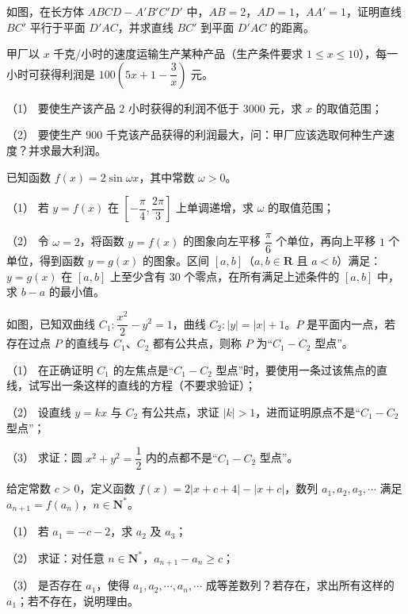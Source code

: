 \Needspace{0.4\textheight}
\begin{question}
如图，在长方体 $ABCD-A'B'C'D'$ 中，$AB=2$，$AD=1$，$AA'=1$，证明直线 $BC'$ 平行于平面 $D'AC$，并求直线 $BC'$ 到平面 $D'AC$ 的距离。
\nopagebreak[4]
\begin{center}\end{center}
\nopagebreak[4]
\end{question}
\begin{question}
甲厂以 $x$ 千克/小时的速度运输生产某种产品（生产条件要求 $1\leqslant x\leqslant10$），每一小时可获得利润是 $100\left(5x+1-\dfrac3x\right)$ 元。

（1） 要使生产该产品 $2$ 小时获得的利润不低于 $3000$ 元，求 $x$ 的取值范围；

（2） 要使生产 $900$ 千克该产品获得的利润最大，问：甲厂应该选取何种生产速度？并求最大利润。

\end{question}
\begin{question}
已知函数 $f(x)=2\sin\omega x$，其中常数 $\omega>0$。

（1） 若 $y=f(x)$ 在 $\left[-\dfrac{\pi}{4},\dfrac{2\pi}{3}\right]$ 上单调递增，求 $\omega$ 的取值范围；

（2） 令 $\omega=2$，将函数 $y=f(x)$ 的图象向左平移 $\dfrac{\pi}{6}$ 个单位，再向上平移 $1$ 个单位，得到函数 $y=g(x)$ 的图象。区间 $[a,b]$（$a,b\in\mathbf R$ 且 $a<b$）满足：$y=g(x)$ 在 $[a,b]$ 上至少含有 $30$ 个零点，在所有满足上述条件的 $[a,b]$ 中，求 $b-a$ 的最小值。

\Needspace{0.4\textheight}
\end{question}
\begin{question}
如图，已知双曲线 $C_1:\dfrac{x^2}{2}-y^2=1$，曲线 $C_2:|y|=|x|+1$。$P$ 是平面内一点，若存在过点 $P$ 的直线与 $C_1$、$C_2$ 都有公共点，则称 $P$ 为“$C_1-C_2$ 型点”。
\nopagebreak[4]
\begin{center}\end{center}
\nopagebreak[4]
（1） 在正确证明 $C_1$ 的左焦点是“$C_1-C_2$ 型点”时，要使用一条过该焦点的直线，试写出一条这样的直线的方程（不要求验证）；

（2） 设直线 $y=kx$ 与 $C_2$ 有公共点，求证 $|k|>1$，进而证明原点不是“$C_1-C_2$ 型点”；

（3） 求证：圆 $x^2+y^2=\dfrac12$ 内的点都不是“$C_1-C_2$ 型点”。

\end{question}
\begin{question}
给定常数 $c>0$，定义函数 $f(x)=2|x+c+4|-|x+c|$，数列 $a_1,a_2,a_3,\cdots$ 满足 $a_{n+1}=f(a_n)$，$n\in\mathbf N^*$。

（1） 若 $a_1=-c-2$，求 $a_2$ 及 $a_3$；

（2） 求证：对任意 $n\in\mathbf N^*$，$a_{n+1}-a_n\geqslant c$；

（3） 是否存在 $a_1$，使得 $a_1,a_2,\cdots,a_n,\cdots$ 成等差数列？若存在，求出所有这样的 $a_1$；若不存在，说明理由。

\end{question}